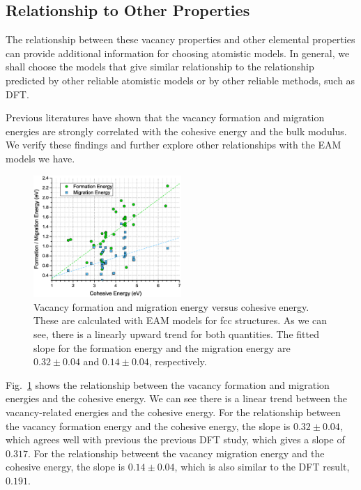 \documentclass[%
 reprint,
 amsmath,amssymb,
 aps,
]{revtex4-1}
\begin{document}
\subsection{\label{sec:calcvsprop}Relationship to Other Properties}

The relationship between these vacancy properties and other elemental properties can provide additional information for choosing atomistic models.
In general, we shall choose the models that give similar relationship to the relationship predicted by other reliable atomistic models or by other reliable methods, such as DFT.

Previous literatures have shown that the vacancy formation and migration energies are strongly correlated with the cohesive energy and the bulk modulus.
We verify these findings and further explore other relationships with the EAM models we have.

\begin{figure}
\centering
\includegraphics[width=0.5\textwidth, clip, trim = 10mm 10mm 10mm 10mm]{vfevme_vs_coh}%
\caption{\label{fig:vfevmevscoh}
Vacancy formation and migration energy versus cohesive energy.
These are calculated with EAM models for fcc structures.
As we can see, there is a linearly upward trend for both quantities.
The fitted slope for the formation energy and the migration energy are $0.32\pm0.04$ and $0.14\pm0.04$, respectively.
}
\end{figure}

Fig.~\ref{fig:vfevmevscoh} shows the relationship between the vacancy formation and migration energies and the cohesive energy.
We can see there is a linear trend between the vacancy-related energies and the cohesive energy.
For the relationship between the vacancy formation energy and the cohesive energy, the slope is $0.32\pm0.04$, which agrees well with previous the previous DFT study, which gives a slope of $0.317$.
For the relationship betweent the vacancy migration energy and the cohesive energy, the slope is $0.14\pm0.04$, which is also similar to the DFT result, $0.191$.
\end{document}
